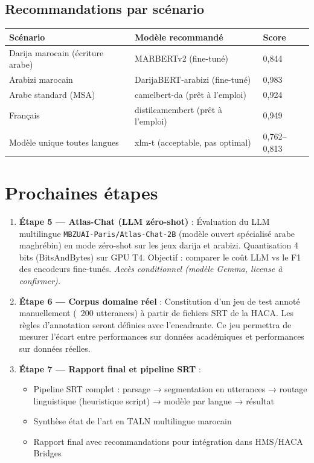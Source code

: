 \documentclass[12pt, a4paper]{article}
\begin{document}
\subsection{Recommandations par scénario}

\begin{center}
\begin{tabular}{lll}
\toprule
\textbf{Scénario} & \textbf{Modèle recommandé} & \textbf{Score} \\
\midrule
Darija marocain (écriture arabe) & MARBERTv2 (fine-tuné) & 0{,}844 \\
Arabizi marocain                 & DarijaBERT-arabizi (fine-tuné) & 0{,}983 \\
Arabe standard (MSA)             & camelbert-da (prêt à l'emploi) & 0{,}924 \\
Français                         & distilcamembert (prêt à l'emploi) & 0{,}949 \\
Modèle unique toutes langues     & xlm-t (acceptable, pas optimal) & 0{,}762--0{,}813 \\
\bottomrule
\end{tabular}
\end{center}

\section{Prochaines étapes}

\begin{enumerate}
  \item \textbf{Étape 5 — Atlas-Chat (LLM zéro-shot)} :
    Évaluation du LLM multilingue
    \texttt{MBZUAI-Paris/Atlas-Chat-2B} (modèle ouvert spécialisé arabe
    maghrébin) en mode zéro-shot sur les jeux darija et arabizi. Quantisation
    4 bits (BitsAndBytes) sur GPU T4. Objectif : comparer le coût LLM
    vs le F1 des encodeurs fine-tunés. \textit{Accès conditionnel
    (modèle Gemma, license à confirmer).}

  \item \textbf{Étape 6 — Corpus domaine réel} :
    Constitution d'un jeu de test annoté manuellement (~200 utterances) à
    partir de fichiers SRT de la HACA. Les règles d'annotation seront
    définies avec l'encadrante. Ce jeu permettra de mesurer l'écart entre
    performances sur données académiques et performances sur données réelles.

  \item \textbf{Étape 7 — Rapport final et pipeline SRT} :
    \begin{itemize}
      \item Pipeline SRT complet : parsage → segmentation en utterances →
        routage linguistique (heuristique script) → modèle par langue → résultat
      \item Synthèse état de l'art en TALN multilingue marocain
      \item Rapport final avec recommandations pour intégration dans HMS/HACA Bridges
    \end{itemize}
\end{enumerate}
\end{document}
